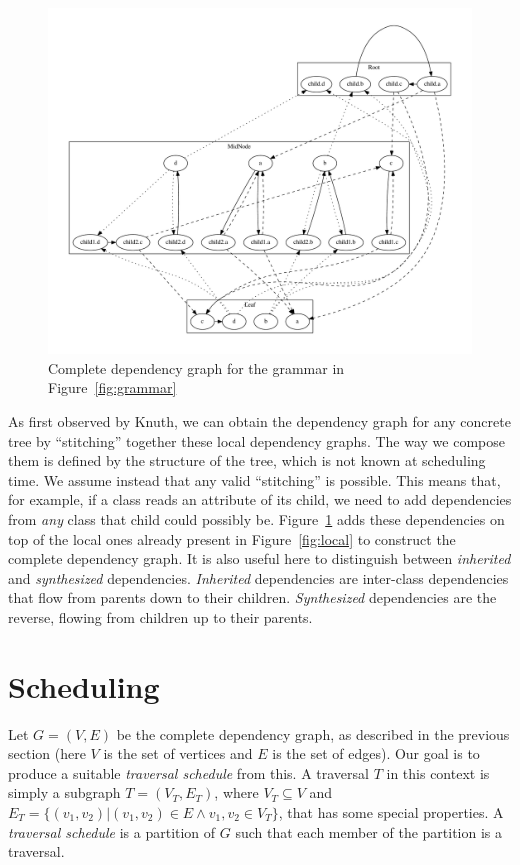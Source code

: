 \documentclass[10pt]{article}
\begin{document}
    \begin{figure}[h]
        \begin{center}
            \includegraphics[scale=0.3]{complete}
        \end{center}
        \caption{Complete dependency graph for the grammar in Figure~\ref{fig:grammar}}
        \label{fig:complete}
    \end{figure}

    As first observed by Knuth, we can obtain the dependency graph for any concrete tree by ``stitching'' together these local dependency graphs. The way we compose them is defined by the structure of the tree, which is not known at scheduling time. We assume instead that any valid ``stitching'' is possible. This means that, for example, if a class reads an attribute of its child, we need to add dependencies from \emph{any} class that child could possibly be. Figure~\ref{fig:complete}
    adds these dependencies on top of the local ones already present in Figure~\ref{fig:local} to construct the complete dependency graph. It is also useful here to distinguish between \emph{inherited} and \emph{synthesized} dependencies. \emph{Inherited} dependencies are inter-class dependencies that flow from parents down to their children. \emph{Synthesized} dependencies are the reverse, flowing from children up to their parents.

    \section{Scheduling}
    Let $G = (V, E)$ be the complete dependency graph, as described in the previous section (here $V$ is the set of vertices and $E$ is the set of edges). Our goal is to produce a suitable \emph{traversal schedule} from this. A traversal $T$ in this context is simply a subgraph $T = (V_T, E_T)$, where $ V_T \subseteq V$ and $ E_T = \{(v_1,v_2) | (v_1, v_2) \in E \wedge  v_1,v_2 \in V_T\}$, that has some special properties. A \emph{traversal schedule} is a partition of $G$ such that each member of the
    partition is a traversal.
\end{document}

